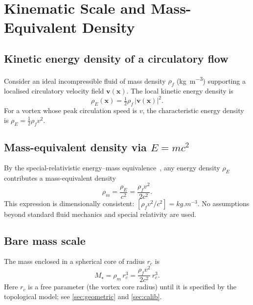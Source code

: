 \documentclass[11pt, a4paper]{article}
\newcommand{\vv}{v}          %
\newcommand{\rc}{r_c}        %
\newcommand{\rhof}{\rho_f}   %
\newcommand{\rhoE}{\rho_E}   %
\newcommand{\rhom}{\rho_m}   %
\begin{document}
\section{Kinematic Scale and Mass-Equivalent Density}
\label{sec:kinematic}

\subsection{Kinetic energy density of a circulatory flow}
\label{sec:kinetic}

Consider an ideal incompressible fluid of mass density
$\rhof$ (\si{kg.m^{-3}}) supporting a localised circulatory
velocity field $\mathbf{v}(\mathbf{x})$.
The local kinetic energy density is~\cite{Batchelor1967,Lamb1932}
\begin{equation}
  \rhoE(\mathbf{x}) = \tfrac{1}{2}\rhof\,|\mathbf{v}(\mathbf{x})|^2.
  \label{eq:rhoE}
\end{equation}
For a vortex whose peak circulation speed is $\vv$,
the characteristic energy density is
$\rhoE = \frac{1}{2}\rhof\vv^2$.

\subsection{Mass-equivalent density via $E=mc^2$}
\label{sec:rhom}

By the special-relativistic energy--mass equivalence~\cite{Einstein1905},
any energy density $\rhoE$ contributes a mass-equivalent
density
\begin{equation}
  \rhom = \frac{\rhoE}{c^2} = \frac{\rhof\vv^2}{2c^2}.
  \label{eq:rhom}
\end{equation}
This expression is dimensionally consistent:
$[\rhof\vv^2/c^2] = \si{kg.m^{-3}}$.
No assumptions beyond standard fluid mechanics and special
relativity are used.

\subsection{Bare mass scale}
\label{sec:Mstar}

The mass enclosed in a spherical core of radius $\rc$ is
\begin{equation}
  M_\star = \rhom\,\rc^3 = \frac{\rhof\vv^2}{2c^2}\,\rc^3.
  \label{eq:Mstar}
\end{equation}
Here $\rc$ is a free parameter (the vortex core radius) until
it is specified by the topological model; see
\cref{sec:geometric} and \cref{sec:calib}.
\end{document}
